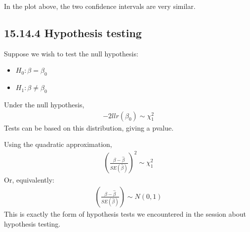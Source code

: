 \documentclass[letterpaper,10pt,english]{jupyterBook}
\begin{document}
\sphinxAtStartPar
In the plot above, the two confidence intervals are very similar.


\subsection{15.14.4 Hypothesis testing}
\label{\detokenize{15.m. Logistic Regression:hypothesis-testing}}
\sphinxAtStartPar
Suppose we wish to test the null hypothesis:
\begin{itemize}
\item {} 
\sphinxAtStartPar
\(H_0: \beta = \beta_0\)

\item {} 
\sphinxAtStartPar
\(H_1: \beta \neq \beta_0\)

\end{itemize}

\sphinxAtStartPar
{}

\sphinxAtStartPar
Under the null hypothesis,
\begin{equation*}
\begin{split}
-2 llr(\beta_0) \sim \chi^2_1
\end{split}
\end{equation*}
\sphinxAtStartPar
Tests can be based on this distribution, giving a p\sphinxhyphen{}value.

\sphinxAtStartPar
{}

\sphinxAtStartPar
Using the quadratic approximation,
\begin{equation*}
\begin{split}
\left( \frac{\beta - \hat{\beta}}{SE(\hat{\beta})} \right)^2  \sim \chi^2_1
\end{split}
\end{equation*}
\sphinxAtStartPar
Or, equivalently:
\begin{equation*}
\begin{split}
\left( \frac{\beta - \hat{\beta}}{SE(\hat{\beta})} \right)  \sim N(0,1)
\end{split}
\end{equation*}
\sphinxAtStartPar
This is exactly the form of hypothesis tests we encountered in the session about hypothesis testing.
\end{document}
